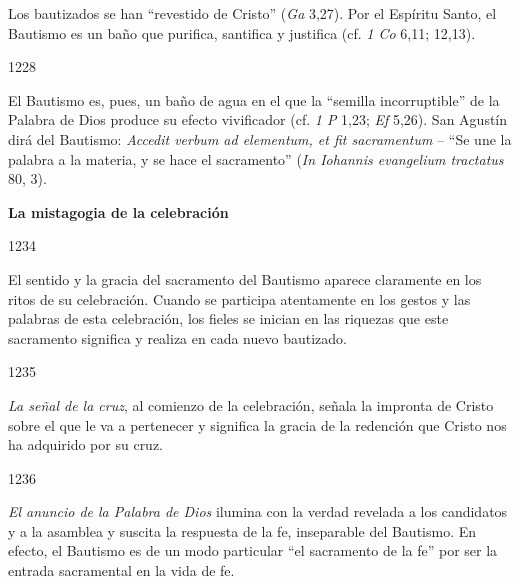 			\begin{ccebody}Los bautizados se han “revestido de Cristo” (\textit{Ga} 3,27). Por el Espíritu Santo, el Bautismo es un baño que purifica, santifica y justifica (cf. \textit{1 Co} 6,11; 12,13).\end{ccebody}
			
			\begin{ccebody}\begin{ccenumber}1228\end{ccenumber} El Bautismo es, pues, un baño de agua en el que la “semilla incorruptible” de la Palabra de Dios produce su efecto vivificador (cf. \textit{1 P} 1,23; \textit{Ef} 5,26). San Agustín dirá del Bautismo: \textit{Accedit verbum ad elementum, et fit sacramentum} – “Se une la palabra a la materia, y se hace el sacramento” (\textit{In Iohannis evangelium tractatus} 80, 3).\end{ccebody}
			
			\begin{ccebody}\textbf{La mistagogia de la celebración}\end{ccebody}
			
			\begin{ccebody}\begin{ccenumber}1234\end{ccenumber} El sentido y la gracia del sacramento del Bautismo aparece claramente en los ritos de su celebración. Cuando se participa atentamente en los gestos y las palabras de esta celebración, los fieles se inician en las riquezas que este sacramento significa y realiza en cada nuevo bautizado.\end{ccebody}
			
			\begin{ccebody}\begin{ccenumber}1235\end{ccenumber} \textit{La señal de la cruz}, al comienzo de la celebración, señala la impronta de Cristo sobre el que le va a pertenecer y significa la gracia de la redención que Cristo nos ha adquirido por su cruz.\end{ccebody}
			
			\begin{ccebody}\begin{ccenumber}1236\end{ccenumber} \textit{El anuncio de la Palabra de Dios} ilumina con la verdad revelada a los candidatos y a la asamblea y suscita la respuesta de la fe, inseparable del Bautismo. En efecto, el Bautismo es de un modo particular “el sacramento de la fe” por ser la entrada sacramental en la vida de fe.\end{ccebody}
			
